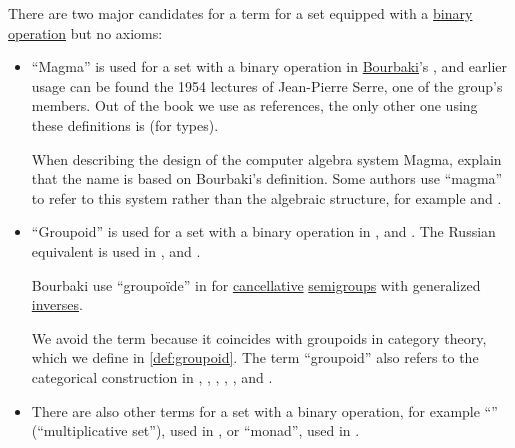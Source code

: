 \begin{remark}\label{rem:magma_terminology}
  There are two major candidates for a term for a set equipped with a \hyperref[def:binary_operation]{binary operation} but no axioms:
  \begin{itemize}
    \item \enquote{Magma} is used for a set with a binary operation in \hyperref[rem:bourbaki]{Bourbaki}'s \cite[def. A I.1]{Bourbaki1970Algèbre1à3}, and earlier usage can be found the 1954 lectures \cite[18]{Serre1992LieGroups} of Jean-Pierre Serre, one of the group's members. Out of the book we use as references, the only other one using these definitions is \cite[33]{UnivalentFoundationsProgram2013HoTT} (for types).

    When describing the design of the computer algebra system Magma, \textcite[1]{BosmaCannonMatthews1994MagmaLanguage} explain that the name is based on Bourbaki's definition. Some authors use \enquote{magma} to refer to this system rather than the algebraic structure, for example \textcite{Rotman2015AdvancedModernAlgebraPart1} and \textcite{ConwaySloane1998SpherePackings}.

    \item \enquote{Groupoid} is used for a set with a binary operation in
    \cite[145]{Knauer2019AlgebraicGraphTheory},
    \cite[example 21.3]{Golan1999Semirings} and
    \cite[257]{HillePhillips1996FunctionalAnalysis}. The Russian equivalent  is used in
    \cite[89]{Мальцев1970АлгебраическиеСистемы},
    \cite[34]{Курош1973ОбщаяАлгебра} and
    \cite[121]{БелоусовТкачёв2004ДискретнаяМатематика}.

    Bourbaki use \enquote{groupo\"ide} in \cite[def. A I.127]{Bourbaki1970Algèbre1à3} for \hyperref[def:binary_operation/cancellative]{cancellative} \hyperref[def:semigroup]{semigroups} with generalized \hyperref[def:monoid_inverse]{inverses}.

    We avoid the term because it coincides with groupoids in category theory, which we define in \cref{def:groupoid}. The term \enquote{groupoid} also refers to the categorical construction in
    \cite[20]{MacLane1998CategoryTheory},
    \cite[def. 1.7.4]{Schubert1972Categories},
    \cite[168]{Awodey2010CategoryTheory},
    \cite[12]{Jacobson1989BasicAlgebraII},
    \cite[example 4.6]{Aluffi2009Algebra},
    \cite[145]{Knauer2019AlgebraicGraphTheory} and
    \cite[def. 1.1.29]{Perrone2024StartingCategoryTheory}.

    \item There are also other terms for a set with a binary operation, for example \enquote{} (\enquote{multiplicative set}), used in \cite[20]{Ляпин1960Полугруппы}, or \enquote{monad}, used in \cite[29]{Jacobson1985BasicAlgebraI}.
  \end{itemize}


\end{remark}
